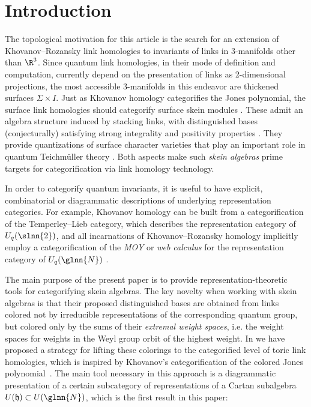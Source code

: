 \section{Introduction}



The topological motivation for this article is the search for an extension of
Khovanov--Rozansky link homologies \cite{Kh1, KhR} to invariants of links in
3-manifolds other than $\R^3$. Since quantum link homologies, in their mode of
definition and computation, currently depend on the presentation of links as
2-dimensional projections, the most accessible 3-manifolds in this endeavor are
thickened surfaces $\Sigma\times I$. Just as Khovanov homology categorifies the
Jones polynomial, the surface link homologies should categorify surface skein
modules \cite{Prz1,Tur, APS}. These admit an algebra structure induced by
stacking links, with distinguished bases (conjecturally) satisfying strong
integrality and positivity properties \cite{FG, Thu, Le, MS, Bou}. They provide
quantizations of surface character varieties that play an important role in
quantum Teichm{\"u}ller theory \cite{BW1}. Both aspects make such \textit{skein
algebras} prime targets for categorification via link homology technology.

In order to categorify quantum invariants, it is useful to have explicit,
combinatorial or diagrammatic descriptions of underlying representation
categories. For example, Khovanov homology can be built from a categorification
of the Temperley--Lieb category, which describes the representation category of
$U_q(\slnn{2})$, and all incarnations of Khovanov--Rozansky homology implicitly
employ a categorification of the \textit{MOY} or \textit{web calculus} for the
representation category of $U_q(\glnn{N})$ \cite{MOY, CKM}.

The main purpose of the present paper is to provide representation-theoretic
tools for categorifying skein algebras. The key novelty when working with skein
algebras is that their proposed distinguished bases are obtained from links
colored not by irreducible representations of the corresponding quantum group,
but colored only by the sums of their \textit{extremal weight spaces}, i.e. the
weight spaces for weights in the Weyl group orbit of the highest weight. In
\cite[Section 1.3]{QW} we have proposed a strategy for lifting these colorings
to the categorified level of toric link homologies, which is inspired by
Khovanov's categorification of the colored Jones polynomial~\cite{Kh7}. The main
tool necessary in this approach is a diagrammatic presentation of a certain
subcategory of representations of a Cartan subalgebra $U(\mathfrak{h})\subset
U(\glnn{N})$, which is the first result in this paper:


